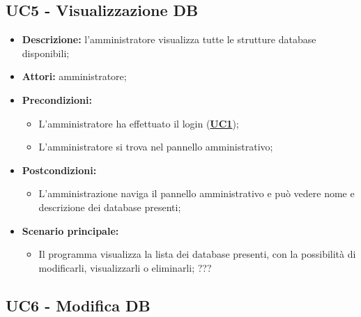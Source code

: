 \documentclass[5pt]{article}
\begin{document}
\subsection{UC5 - Visualizzazione DB}
\label{sec:UC5}
\begin{itemize}
	\item \textbf{Descrizione:} l’amministratore visualizza tutte le strutture database disponibili;
	\item \textbf{Attori:} amministratore;
	\item \textbf{Precondizioni:} 
	\begin{itemize}
		\item L’amministratore ha effettuato il login (\hyperref[sec:UC1]{\textbf{UC1}});
		\item L’amministratore si trova nel pannello amministrativo;
	\end{itemize}
	\item \textbf{Postcondizioni:} 
	\begin{itemize}
		\item L'amministrazione naviga il pannello amministrativo e può vedere nome e descrizione dei database presenti;
	\end{itemize}
	\item \textbf{Scenario principale:} 
	\begin{itemize}
		\item Il programma visualizza la lista dei database presenti, con la possibilità di modificarli, visualizzarli o eliminarli; ???
	\end{itemize}
\end{itemize}

\subsection{UC6 - Modifica DB}
\label{sec:UC6}
\end{document}
